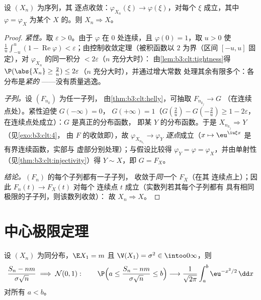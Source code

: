 \begin{theorem}[莱维连续性定理]
\label{thm:b3:clt:levy}
设 $(X_n)$ 为序列，其
逐点收敛：$\varphi_{X_n}(\xi) \to
\varphi(\xi)$，对每个 $\xi$ 成立，其中 $\varphi =
\varphi_X$ 为某个
$X$ 的。则 $X_n \Rightarrow X$。
\end{theorem}

\begin{proof}
\emph{紧性。}取 $\varepsilon > 0$。由于 $\varphi$ 在
$0$ 处连续，且 $\varphi(0) = 1$，取 $u > 0$ 使
$\frac1u\int_{-u}^u(1 - \operatorname{Re}\varphi) <
\varepsilon$；由控制收敛定理（被积函数以
$2$ 为界（区间 $[-u,u]$ 固定），对
$\varphi_{X_n}$ 的同一积分 $< 2\varepsilon$（$n$ 充分大时）：
由\cref{lem:b3:clt:tightness}得 $\P(\abs{X_n} \geq \frac2u)
\leq 2\varepsilon$（$n$ 充分大时），并通过增大常数
处理其余有限多个：各分布是\emph{紧的}
——没有质量逃逸。

\emph{子列。}设 $(F_{n_k})$ 为任一子列，
由\cref{thm:b3:clt:helly}，可抽取 $F_{n_{k_j}} \to G$
（在连续点处）。紧性迫使 $G(-\infty) = 0$，
$G(+\infty) = 1$（$G(\frac2u) - G(-\frac2u) \geq 1 -
2\varepsilon$，在连续点处成立）：$G$ 是真正的分布函数，
即某 $Y$ 的分布函数。于是
$X_{n_{k_j}} \Rightarrow Y$（见\cref{exo:b3:clt:4}，
由 $F$ 的收敛即），故
$\varphi_{X_{n_{k_j}}} \to \varphi_Y$ \emph{逐点}成立（$x
\mapsto \eu^{\iu\xi x}$ 是有界连续函数，实部与
虚部分别处理）；与假设比较得
$\varphi_Y = \varphi = \varphi_X$，并由单射性
（见\cref{thm:b3:clt:injectivity}）得 $Y \sim X$，即 $G =
F_X$。

\emph{结论。}$(F_n)$ 的每个子列都有一子子列，
收敛于\emph{同一}个 $F_X$（在其
连续点上）；因此 $F_n(t) \to F_X(t)$ 对每个
连续点 $t$ 成立（实数列若其每个子列都有
具有相同极限的子子列，则该数列收敛）：
故 $X_n \Rightarrow X$。
\end{proof}

\section{中心极限定理}

\begin{theorem}[中心极限定理]\label{thm:b3:clt:clt}
设 $(X_n)$ 为同分布，$\E X_1 = m$ 且 $\V(X_1) =
\sigma^2 \in \intoo0\infty$，则
\[
\frac{S_n - nm}{\sigma\sqrt n} \;\Longrightarrow\; \mathcal
N(0, 1) :
\qquad
\P\Bigl(a \leq \frac{S_n - nm}{\sigma\sqrt n} \leq
b\Bigr) \longrightarrow
\frac{1}{\sqrt{2\pi}}\int_a^b\eu^{-x^2/2}\,\dd x
\]
对所有 $a < b$。
\end{theorem}

